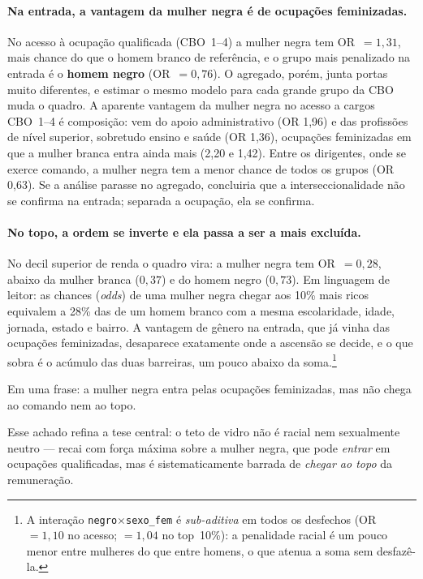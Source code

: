 \documentclass[12pt, a4paper, oneside]{article}
\begin{document}
\paragraph{Na entrada, a vantagem da mulher negra é de ocupações feminizadas.}
No acesso à ocupação qualificada (CBO~1--4) a mulher negra tem OR~$=1,31$,
mais chance do que o homem branco de referência, e o grupo mais penalizado na entrada
é o \textbf{homem negro} (OR~$=0,76$). O agregado, porém, junta portas
muito diferentes, e estimar o mesmo modelo para cada grande grupo da CBO muda o
quadro. A aparente vantagem da mulher negra no acesso a cargos CBO~1--4 é composição: vem do apoio administrativo (OR 1,96) e das profissões de nível superior, sobretudo ensino e saúde (OR 1,36), ocupações feminizadas em que a mulher branca entra ainda mais (2,20 e 1,42). Entre os dirigentes, onde se exerce comando, a mulher negra tem a menor chance de todos os grupos (OR 0,63). Se a análise parasse no agregado, concluiria que a
interseccionalidade não se confirma na entrada; separada a ocupação, ela se confirma.

\paragraph{No topo, a ordem se inverte e ela passa a ser a mais excluída.}
No decil superior de renda o quadro vira: a mulher negra tem OR~$=0,28$,
abaixo da mulher branca ($0,37$) e do homem negro
($0,73$). Em linguagem de leitor: as chances (\emph{odds}) de uma
mulher negra chegar aos 10\% mais ricos equivalem a 28\% das de um homem branco com a
mesma escolaridade, idade, jornada, estado e bairro. A vantagem de gênero na
entrada, que já vinha das ocupações feminizadas, desaparece exatamente onde a ascensão
se decide, e o que sobra é o acúmulo das duas barreiras, um pouco abaixo da soma.\footnote{A interação \texttt{negro$\times$sexo\_fem} é
\emph{sub-aditiva} em todos os desfechos (OR~$=1,10$ no acesso;
$=1,04$ no top~10\%): a penalidade racial é um pouco menor entre
mulheres do que entre homens, o que atenua a soma sem desfazê-la.}

Em uma frase: a mulher negra entra pelas ocupações feminizadas, mas não chega ao
comando nem ao topo.

Esse achado refina a tese central: o teto de vidro não é racial nem sexualmente neutro
--- recai com força máxima sobre a mulher negra, que pode \emph{entrar} em ocupações
qualificadas, mas é sistematicamente barrada de \emph{chegar ao topo} da remuneração.
\end{document}
